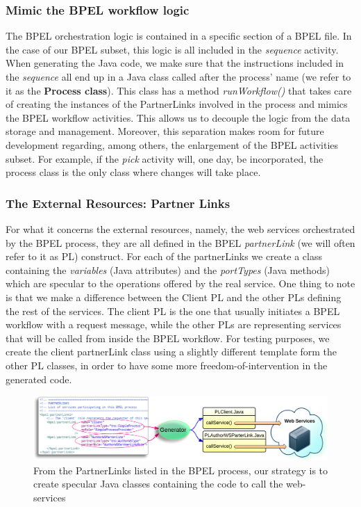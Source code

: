 \subsubsection{Mimic the BPEL workflow logic}
\label{sec:mimicBPELLogic}
The BPEL orchestration logic is contained in a specific section of a BPEL file. In the case of our BPEL subset, this logic is all included in the \textit{sequence} activity. When generating the Java code, we make sure that the instructions included in the \textit{sequence} all end up in a Java class called after the process' name (we refer to it as the \textbf{Process class}). This class has a method \textit{runWorkflow()} that takes care of creating the instances of the PartnerLinks involved in the process and mimics the BPEL workflow activities.  
This allows us to decouple the logic from the data storage and management. Moreover, this separation makes room for future development regarding, among others, the enlargement of the BPEL activities subset. For example, if the \textit{pick} activity will, one day, be incorporated, the process class is the only class where changes will take place.

\subsubsection{The External Resources: Partner Links}
\label{sec:extrenalResources}
For what it concerns the external resources, namely, the web services orchestrated by the BPEL process, they are all defined in the BPEL \textit{partnerLink} (we will often refer to it as PL) construct. For each of the partnerLinks we create a class containing the \textit{variables} (Java attributes) and the \textit{portTypes} (Java methods) which are specular to the operations offered by the real service.
One thing to note is that we make a difference between the Client PL and the other PLs defining the rest of the services. The client PL is the one that usually initiates a BPEL workflow with a request message, while the other PLs are representing services that will be called from inside the BPEL workflow. For testing purposes, we create the client partnerLink class using a slightly different template form the other PL classes, in order to have some more freedom-of-intervention in the generated code.

\begin{figure}
  \begin{center}
    \includegraphics[scale=0.9]{pictures/PLTranslation.png}
    \caption{From the PartnerLinks listed in the BPEL process, our strategy is to create specular Java classes containing the code to call the web-services}
    \label{fig:PLTranslation}
  \end{center}
\end{figure} 

